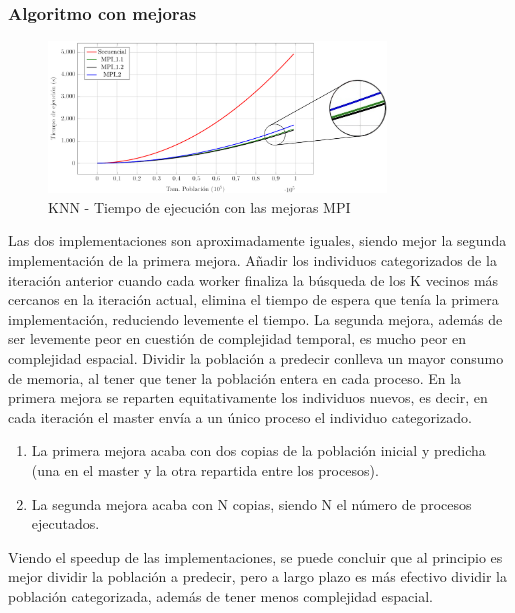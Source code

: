 		\subsubsection{Algoritmo con mejoras}


			\begin{figure}[!h]
				\centering
				\includegraphics[width=0.8\textwidth]{images/chapter_4/knn_mpi}
				\caption{KNN - Tiempo de ejecución con las mejoras MPI}
				\label{fig:example}
			\end{figure}
			
			Las dos implementaciones son aproximadamente iguales, siendo mejor la segunda implementación de la primera mejora. Añadir los individuos categorizados de la iteración anterior cuando cada worker finaliza la búsqueda de los K vecinos más cercanos en la iteración actual, elimina el tiempo de espera que tenía la primera implementación, reduciendo levemente el tiempo.
			La segunda mejora, además de ser levemente peor en cuestión de complejidad temporal, es mucho peor en complejidad espacial. Dividir la población a predecir conlleva un mayor consumo de memoria, al tener que tener la población entera en cada proceso. En la primera mejora se reparten equitativamente los individuos nuevos, es decir, en cada iteración el master envía a un único proceso el individuo categorizado.
			
			
			\begin{enumerate}
				\item La primera mejora acaba con dos copias de la población inicial y predicha (una en el master y la otra repartida entre los procesos).
				\item La segunda mejora acaba con N copias, siendo N el número de procesos ejecutados.
			\end{enumerate}
		

			Viendo el speedup de las implementaciones, se puede concluir que al principio es mejor dividir la población a predecir, pero a largo plazo es más efectivo dividir la población categorizada, además de tener menos complejidad espacial. 
		
